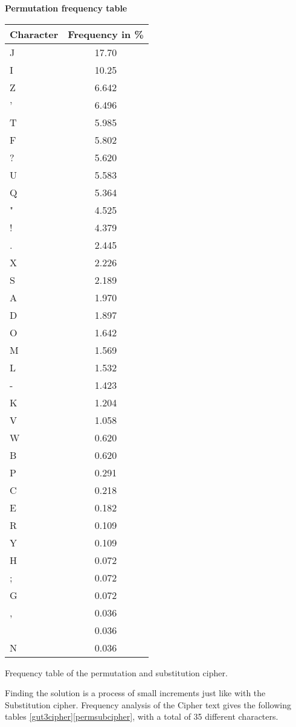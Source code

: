 \documentclass{uva-inf-bachelor-thesis}
\begin{document}
\begin{minipage}{0.5\textwidth}
\vspace{-16pt}
\centering
\textbf{Permutation frequency table}
\begin{tabular}{l|c}\toprule
Character & Frequency in \%     \\
\midrule
J & 17.70 \\
I & 10.25 \\
Z & 6.642 \\
' & 6.496 \\
T & 5.985 \\
F & 5.802 \\
? & 5.620 \\
U & 5.583 \\
Q & 5.364 \\
" & 4.525 \\
! & 4.379 \\
. & 2.445 \\
X & 2.226 \\
S & 2.189 \\
A & 1.970 \\
D & 1.897 \\
O & 1.642 \\
M & 1.569 \\
L & 1.532 \\
- & 1.423 \\
K & 1.204 \\
V & 1.058 \\
W & 0.620 \\
B & 0.620 \\
P & 0.291 \\
C & 0.218 \\
E & 0.182 \\
R & 0.109 \\
Y & 0.109 \\
H & 0.072 \\
; & 0.072 \\
G & 0.072 \\
, & 0.036 \\
  & 0.036 \\
N & 0.036 \\ \bottomrule
\end{tabular}
\caption{Frequency table of the permutation and substitution cipher.}
\label{permsubcipher}
\end{minipage}

Finding the solution is a process of small increments just like with the
Substitution cipher.
Frequency analysis of the Cipher text gives the following tables
\ref{gut3cipher}\ref{permsubcipher}, with a total of 35 different characters.\\
\end{document}
